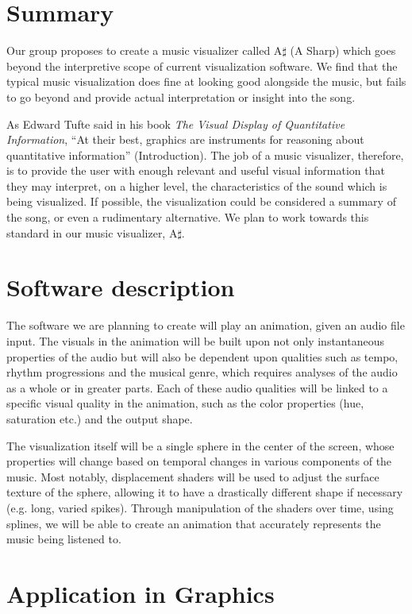 \documentclass{article}
\begin{document}
\section{Summary}

Our group proposes to create a music visualizer called A$\sharp$ (A Sharp) which goes beyond the interpretive scope of current visualization software.  We find that the typical music visualization does fine at looking good alongside the music, but fails to go beyond and provide actual interpretation or insight into the song.

As Edward Tufte said in his book \textit{The Visual Display of Quantitative Information}, ``At their best, graphics are instruments for reasoning about quantitative information'' (Introduction).  The job of a music visualizer, therefore, is to provide the user with enough relevant and useful visual information that they may interpret, on a higher level, the characteristics of the sound which is being visualized.  If possible, the visualization could be considered a summary of the song, or even a rudimentary alternative.  We plan to work towards this standard in our music visualizer, A$\sharp$.

\section{Software description}

The software we are planning to create will play an animation, given an audio file input. The visuals in the animation will be built upon not only instantaneous properties of the audio but will also be dependent upon qualities such as tempo, rhythm progressions and the musical genre, which requires analyses of the audio as a whole or in greater parts. Each of these audio qualities will be linked to a specific visual quality in the animation, such as the color properties (hue, saturation etc.) and the output shape.

The visualization itself will be a single sphere in the center of the screen, whose properties will change based on temporal changes in various components of the music. Most notably, displacement shaders will be used to adjust the surface texture of the sphere, allowing it to have a drastically different shape if necessary (e.g. long, varied spikes). Through manipulation of the shaders over time, using splines, we will be able to create an animation that accurately represents the music being listened to.

\section{Application in Graphics}
\end{document}
